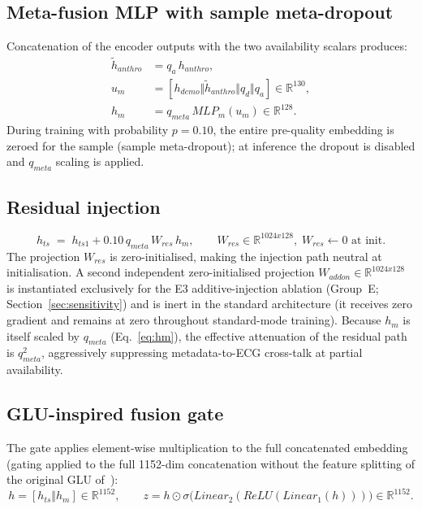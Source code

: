 \documentclass[mathematics,article,submit,pdftex]{Definitions/mdpi}
\def\mathrm#1{#1}%
\def\mathbf#1{#1}%
\def\emph#1{#1}%
\def\times{x}%
\begin{document}
\subsection{Meta-fusion MLP with sample meta-dropout}
Concatenation of the encoder outputs with the two availability scalars produces:
\begin{equation}\label{eq:hm}
\begin{aligned}
\widetilde{\mathbf{h}}_{\mathrm{anthro}} &= q_a\,\mathbf{h}_{\mathrm{anthro}},\\
\mathbf{u}_{\mathrm{m}}&=[\mathbf{h}_{\mathrm{demo}}\Vert\widetilde{\mathbf{h}}_{\mathrm{anthro}}\Vert q_d\Vert q_a]\in\mathbb{R}^{130},\\
\mathbf{h}_{\mathrm{m}}&=q_{\mathrm{meta}}\,\mathrm{MLP}_{\mathrm{m}}(\mathbf{u}_{\mathrm{m}})\in\mathbb{R}^{128}.
\end{aligned}
\end{equation}
During training with probability $p{=}0.10$, the entire pre-quality embedding is zeroed for the sample (\emph{sample meta-dropout}); at inference the dropout is disabled and $q_{\mathrm{meta}}$ scaling is applied.

\subsection{Residual injection}
\begin{equation}\label{eq:hts}
\mathbf{h}_{\mathrm{ts}} \;=\; \mathbf{h}_{\mathrm{ts1}}
  + 0.10\,q_{\mathrm{meta}}\,\mathbf{W}_{\mathrm{res}}\,\mathbf{h}_{\mathrm{m}},\qquad
\mathbf{W}_{\mathrm{res}}\in\mathbb{R}^{1024\times 128},\;\mathbf{W}_{\mathrm{res}}\leftarrow\mathbf{0}\text{ at init.}
\end{equation}
The projection $\mathbf{W}_{\mathrm{res}}$ is zero-initialised, making the injection path neutral at initialisation. A second independent zero-initialised projection $\mathbf{W}_{\mathrm{addon}}\in\mathbb{R}^{1024\times 128}$ is instantiated exclusively for the E3 additive-injection ablation (Group~E; Section~\ref{sec:sensitivity}) and is inert in the standard architecture (it receives zero gradient and remains at zero throughout standard-mode training). Because $\mathbf{h}_{\mathrm{m}}$ is itself scaled by $q_{\mathrm{meta}}$ (Eq.~\eqref{eq:hm}), the effective attenuation of the residual path is $q_{\mathrm{meta}}^{2}$, aggressively suppressing metadata-to-ECG cross-talk at partial availability.

\subsection{GLU-inspired fusion gate}
The gate applies element-wise multiplication to the full concatenated embedding (gating applied to the full 1152-dim concatenation without the feature splitting of the original GLU of~\cite{Dauphin2017}):
\begin{equation}
\mathbf{h} = [\mathbf{h}_{\mathrm{ts}}\Vert \mathbf{h}_{\mathrm{m}}]\in\mathbb{R}^{1152}, \qquad
\mathbf{z} = \mathbf{h} \odot \sigma\!\bigl(\mathrm{Linear}_2(\mathrm{ReLU}(\mathrm{Linear}_1(\mathbf{h})))\bigr)\in\mathbb{R}^{1152}.
\end{equation}
\end{document}
